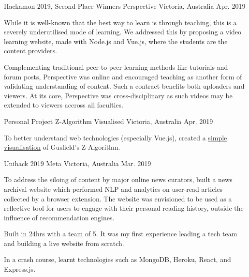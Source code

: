 \begin{cventries}
\cventry
    {Hackamon 2019, Second Place Winners}
    {Perspective}
    {Victoria, Australia}
    {Apr. 2019}
    {
      \begin{cvitems}
        \item {While it is well-known that the best way to learn is through teaching, this is a severely underutilised mode of learning. We addressed this by proposing a video learning website, made with Node.js and Vue.js, where the students are the content providers.}
        \item {Complementing traditional peer-to-peer learning methods like tutorials and forum posts, Perspective was online and encouraged teaching as another form of validating understanding of content. Such a contract benefits both uploaders and viewers. At its core, Perspective was cross-disciplinary as such videos may be extended to viewers accross all faculties.}
      \end{cvitems}
    }
\cventry
    {Personal Project}
    {Z-Algorithm Visualised}
    {Victoria, Australia}
    {Apr. 2019}
    {
      \begin{cvitems}
        \item {To better understand web technologies (especially Vue.js), created a {\color{red} \href{https://zalg.herokuapp.com}{simple visualisation}} of Gusfield's Z-Algorithm.}
      \end{cvitems}
    }
  \cventry
    {Unihack 2019}
    {Meta}
    {Victoria, Australia}
    {Mar. 2019}
    {
      \begin{cvitems}
        \item {To address the siloing of content by major online news curators, built a news archival website which performed NLP and analytics on user-read articles collected by a browser extension. The website was envisioned to be used as a reflective tool for users to engage with their personal reading history, outside the influence of recommendation engines.}
        \item {Built in 24hrs with a team of 5. It was my first experience leading a tech team and building a live website from scratch.}
        \item {In a crash course, learnt technologies such as MongoDB, Heroku, React, and Express.js.}
      \end{cvitems}
    }
\end{cventries}

